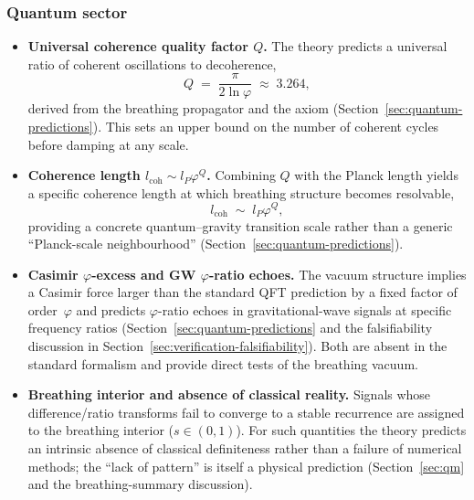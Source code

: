 %

\subsubsection*{Quantum sector}

\begin{itemize}[nosep,leftmargin=*]
\item \textbf{Universal coherence quality factor $Q$.}
  The theory predicts a universal ratio of coherent oscillations to decoherence,
  \[
    Q \;=\; \frac{\pi}{2\ln\varphi} \;\approx\; 3.264,
  \]
  derived from the breathing propagator and the axiom (Section~\ref{sec:quantum-predictions}).
  This sets an upper bound on the number of coherent cycles before damping at any scale.

\item \textbf{Coherence length $l_{\mathrm{coh}} \sim l_P \varphi^{Q}$.}
  Combining $Q$ with the Planck length yields a specific coherence length
  at which breathing structure becomes resolvable,
  \[
    l_{\mathrm{coh}} \;\sim\; l_P \varphi^{Q},
  \]
  providing a concrete quantum--gravity transition scale rather than a generic
  “Planck-scale neighbourhood” (Section~\ref{sec:quantum-predictions}).

\item \textbf{Casimir $\varphi$-excess and GW $\varphi$-ratio echoes.}
  The vacuum structure implies a Casimir force larger than the standard QFT
  prediction by a fixed factor of order~$\varphi$ and predicts $\varphi$-ratio
  echoes in gravitational-wave signals at specific frequency ratios
  (Section~\ref{sec:quantum-predictions} and the falsifiability discussion
  in Section~\ref{sec:verification-falsifiability}). Both are absent in the
  standard formalism and provide direct tests of the breathing vacuum.

\item \textbf{Breathing interior and absence of classical reality.}
  Signals whose difference/ratio transforms fail to converge to a stable
  recurrence are assigned to the breathing interior ($s \in (0,1)$).
  For such quantities the theory predicts an intrinsic absence of classical
  definiteness rather than a failure of numerical methods; the “lack of
  pattern” is itself a physical prediction (Section~\ref{sec:qm} and
  the breathing-summary discussion).
\end{itemize}


